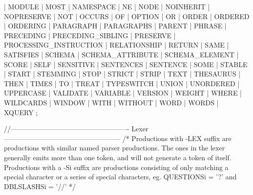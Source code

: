                     | MODULE
                    | MOST
                    | NAMESPACE
                    | NE
                    | NODE
                    | NOINHERIT
                    | NOPRESERVE
                    | NOT
                    | OCCURS
                    | OF
                    | OPTION
                    | OR
                    | ORDER
                    | ORDERED
                    | ORDERING
                    | PARAGRAPH
                    | PARAGRAPHS
                    | PARENT
                    | PHRASE
                    | PRECEDING
                    | PRECEDING_SIBLING
                    | PRESERVE
                    | PROCESSING_INSTRUCTION
                    | RELATIONSHIP
                    | RETURN
                    | SAME
                    | SATISFIES
                    | SCHEMA
                    | SCHEMA_ATTRIBUTE
                    | SCHEMA_ELEMENT
                    | SCORE
                    | SELF
                    | SENSITIVE
                    | SENTENCES
                    | SENTENCE
                    | SOME
                    | STABLE
                    | START
                    | STEMMING
                    | STOP
                    | STRICT
                    | STRIP
                    | TEXT
                    | THESAURUS
                    | THEN
                    | TIMES
                    | TO
                    | TREAT
                    | TYPESWITCH
                    | UNION
                    | UNORDERED
                    | UPPERCASE
                    | VALIDATE
                    | VARIABLE
                    | VERSION
                    | WEIGHT
                    | WHERE
                    | WILDCARDS
                    | WINDOW
                    | WITH
                    | WITHOUT
                    | WORD
                    | WORDS
                    | XQUERY
                    ;
          



//---------------------------------------------------- Lexer ---------------------------------------------------
/*
Productions with -LEX suffix are productions with similar named parser productions. The ones in the lexer generally emits more
than one token, and will not generate a token of itself.
Productions with a -Si suffix are productions consisting of only matching a special character or a series of special characters,
eg. QUESTIONSi = '?' and DBLSLASHSi = '//'
*/


